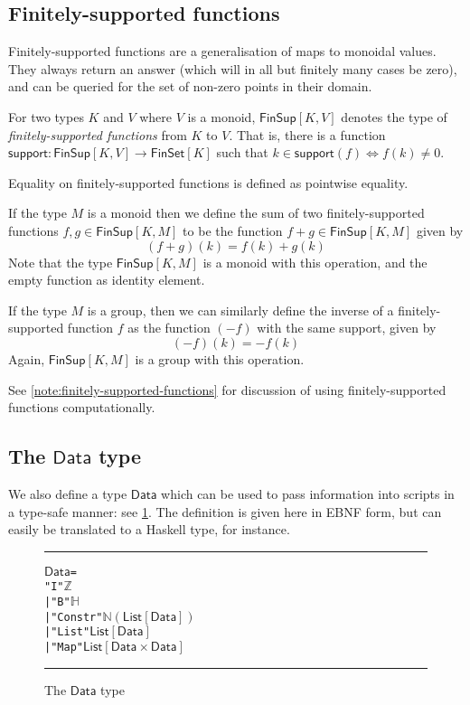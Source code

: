 \documentclass[a4paper]{article}
\newcounter{note}
\newcommand{\s}{\textsf}  %
\newcommand{\msf}[1]{\ensuremath{\mathsf{#1}}}
\newcommand\rfskip{7pt}
\newenvironment{ruledfigure}[1]{\begin{figure}[#1]\hrule\vspace{\rfskip}}{\vspace{\rfskip}\hrule\end{figure}}
\newcommand{\List}[1]{\ensuremath{\s{List}[#1]}}
\newcommand{\FinSet}[1]{\ensuremath{\s{FinSet}[#1]}}
\newcommand{\FinSup}[2]{\ensuremath{\s{FinSup}[#1,#2]}}
\newcommand{\support}{\msf{support}}
\newcommand{\Data}{\ensuremath{\s{Data}}}
\newcommand\N{\ensuremath{\mathbb{N}}}
\newcommand\Z{\ensuremath{\mathbb{Z}}}
\renewcommand\H{\ensuremath{\mathbb{H}}}
\begin{document}
\subsection {Finitely-supported functions}
\label{sec:fsfs}

Finitely-supported functions are a generalisation of maps to monoidal values.
They always return an answer (which will in all but finitely many cases be
zero), and can be queried for the set of non-zero points in their domain.

For two types $K$ and $V$ where $V$ is a monoid, $\FinSup{K}{V}$ denotes the type of
\textit{finitely-supported functions} from $K$ to $V$. That is, there is a
function $\support : \FinSup{K}{V} \rightarrow \FinSet{K}$ such that
$k \in \support(f) \Leftrightarrow f(k) \neq 0$.

Equality on finitely-supported functions is defined as pointwise equality.

If the type $M$ is a monoid then we define the sum of two finitely-supported
functions
$f, g \in \FinSup{K}{M}$ to be the function $f+g \in \FinSup{K}{M}$ given by
\[(f+g)(k) = f(k) + g(k) \]
Note that the type $\FinSup{K}{M}$ is a monoid with this
operation, and the empty function as
identity element.

If the type $M$ is a group, then we can
similarly define the inverse of a finitely-supported function $f$ as
the function $(-f)$ with the same support, given by
\[ (-f)(k) = -f(k) \]
Again, $\FinSup{K}{M}$ is a group with this operation.

See \cref{note:finitely-supported-functions} for discussion of using
finitely-supported functions computationally.

\subsection{The \Data{} type}
We also define a type \Data{} which can be used to pass information
into scripts in a type-safe manner: see \cref{fig:data-defn}. The
definition is given here in EBNF form, but can easily be translated to
a Haskell type, for instance.

\begin{ruledfigure}{H}
\begin{alltt}
  \Data =
      "I" \(\Z\)
    | "B" \(\H\)
    | "Constr" \(\N (\List{\Data})\)
    | "List" \(\List{\Data}\)
    | "Map" \(\List{\Data\times\Data}\)
\end{alltt}
\caption{The \Data{} type}
\label{fig:data-defn}
\end{ruledfigure}
\end{document}
